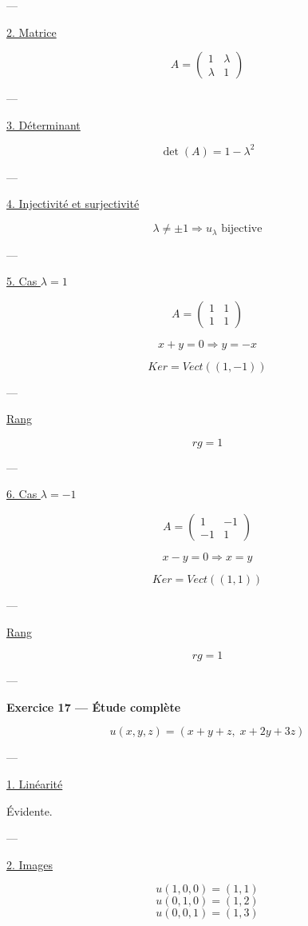 \documentclass[11pt,a4paper]{article}
\begin{document}
---

\underline{2. Matrice}

\[
A =
\begin{pmatrix}
1 & \lambda \\
\lambda & 1
\end{pmatrix}
\]

---

\underline{3. Déterminant}

\[
\det(A)=1-\lambda^2
\]

---

\underline{4. Injectivité et surjectivité}

\[
\boxed{\lambda \neq \pm1 \Rightarrow u_\lambda \text{ bijective}}
\]

---

\underline{5. Cas $\lambda=1$}

\[
A =
\begin{pmatrix}
1 & 1 \\
1 & 1
\end{pmatrix}
\]

\[
x+y=0 \Rightarrow y=-x
\]

\[
\boxed{Ker = Vect((1,-1))}
\]

---

\underline{Rang}

\[
rg=1
\]

---

\underline{6. Cas $\lambda=-1$}

\[
A =
\begin{pmatrix}
1 & -1 \\
-1 & 1
\end{pmatrix}
\]

\[
x-y=0 \Rightarrow x=y
\]

\[
\boxed{Ker = Vect((1,1))}
\]

---

\underline{Rang}

\[
rg=1
\]

---

\textbf{Exercice 17 — Étude complète}

\[
u(x,y,z)=(x+y+z,\; x+2y+3z)
\]

---

\underline{1. Linéarité}

Évidente.

---

\underline{2. Images}

\[
u(1,0,0)=(1,1)
\]
\[
u(0,1,0)=(1,2)
\]
\[
u(0,0,1)=(1,3)
\]
\end{document}
